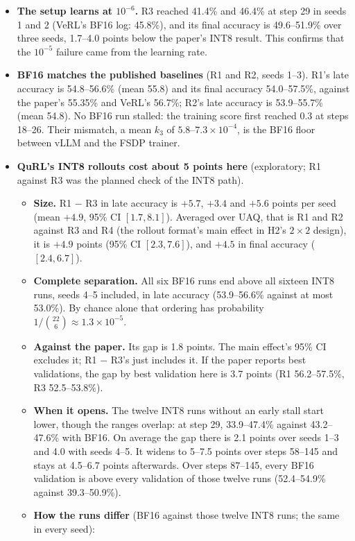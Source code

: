 \documentclass[11pt]{article}
\begin{document}
\begin{itemize}
\item \textbf{The setup learns at $10^{-6}$.} R3 reached 41.4\% and 46.4\% at step 29 in seeds 1 and 2 (VeRL's BF16 log: 45.8\%), and its final accuracy is 49.6--51.9\% over three seeds, 1.7--4.0 points below the paper's INT8 result. This confirms that the $10^{-5}$ failure came from the learning rate.
\item \textbf{BF16 matches the published baselines} (R1 and R2, seeds 1--3). R1's late accuracy is 54.8--56.6\% (mean 55.8) and its final accuracy 54.0--57.5\%, against the paper's 55.35\% and VeRL's 56.7\%; R2's late accuracy is 53.9--55.7\% (mean 54.8). No BF16 run stalled: the training score first reached 0.3 at steps 18--26. Their mismatch, a mean $k_3$ of $5.8$--$7.3\times10^{-4}$, is the BF16 floor between vLLM and the FSDP trainer.
\item \textbf{QuRL's INT8 rollouts cost about 5 points here} (exploratory; R1 against R3 was the planned check of the INT8 path).
  \begin{itemize}
  \item \textbf{Size.} R1 $-$ R3 in late accuracy is $+5.7$, $+3.4$ and $+5.6$ points per seed (mean $+4.9$, 95\% CI $[1.7, 8.1]$). Averaged over UAQ, that is R1 and R2 against R3 and R4 (the rollout format's main effect in H2's $2\times2$ design), it is $+4.9$ points (95\% CI $[2.3, 7.6]$), and $+4.5$ in final accuracy ($[2.4, 6.7]$).
  \item \textbf{Complete separation.} All six BF16 runs end above all sixteen INT8 runs, seeds 4--5 included, in late accuracy (53.9--56.6\% against at most 53.0\%). By chance alone that ordering has probability $1/\binom{22}{6}\approx1.3\times10^{-5}$.
  \item \textbf{Against the paper.} Its gap is 1.8 points. The main effect's 95\% CI excludes it; R1 $-$ R3's just includes it. If the paper reports best validations, the gap by best validation here is 3.7 points (R1 56.2--57.5\%, R3 52.5--53.8\%).
  \item \textbf{When it opens.} The twelve INT8 runs without an early stall start lower, though the ranges overlap: at step 29, 33.9--47.4\% against 43.2--47.6\% with BF16. On average the gap there is 2.1 points over seeds 1--3 and 4.0 with seeds 4--5. It widens to 5--7.5 points over steps 58--145 and stays at 4.5--6.7 points afterwards. Over steps 87--145, every BF16 validation is above every validation of those twelve runs (52.4--54.9\% against 39.3--50.9\%).
  \item \textbf{How the runs differ} (BF16 against those twelve INT8 runs; the same in every seed):

\end{itemize}
\end{itemize}
\end{document}
